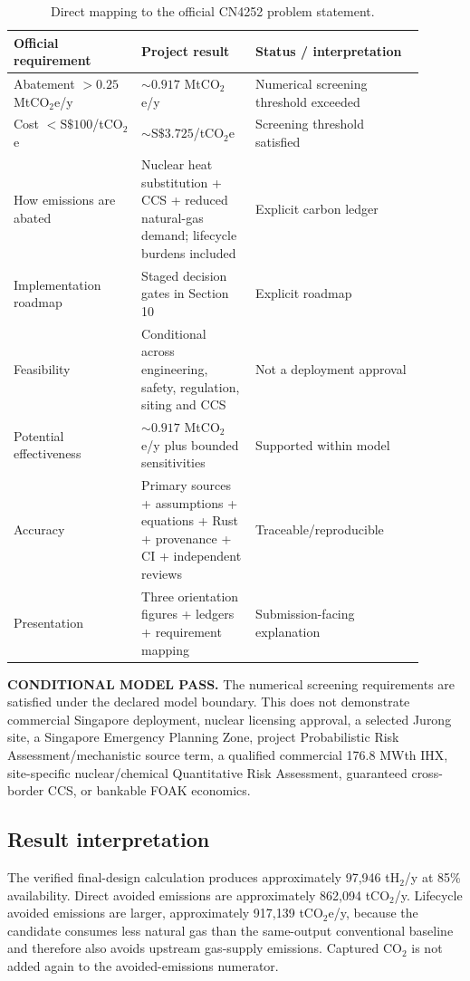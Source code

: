 \begin{table}[htbp]\centering\small
\caption{Direct mapping to the official CN4252 problem statement.}
\begin{tabular}{p{0.28\linewidth}p{0.25\linewidth}p{0.37\linewidth}}
\toprule Official requirement & Project result & Status / interpretation \\ \midrule
Abatement $>0.25$ MtCO$_2$e/y & $\sim0.917$ MtCO$_2$e/y & Numerical screening threshold exceeded\\
Cost $<\mathrm{S\$}100$/tCO$_2$e & $\sim\mathrm{S\$}3.725$/tCO$_2$e & Screening threshold satisfied\\
How emissions are abated & Nuclear heat substitution + CCS + reduced natural-gas demand; lifecycle burdens included & Explicit carbon ledger\\
Implementation roadmap & Staged decision gates in Section 10 & Explicit roadmap\\
Feasibility & Conditional across engineering, safety, regulation, siting and CCS & Not a deployment approval\\
Potential effectiveness & $\sim0.917$ MtCO$_2$e/y plus bounded sensitivities & Supported within model\\
Accuracy & Primary sources + assumptions + equations + Rust + provenance + CI + independent reviews & Traceable/reproducible\\
Presentation & Three orientation figures + ledgers + requirement mapping & Submission-facing explanation\\
\bottomrule
\end{tabular}
\end{table}

\noindent\textbf{CONDITIONAL MODEL PASS.} The numerical screening requirements are satisfied under the declared model boundary. This does not demonstrate commercial Singapore deployment, nuclear licensing approval, a selected Jurong site, a Singapore Emergency Planning Zone, project Probabilistic Risk Assessment/mechanistic source term, a qualified commercial 176.8 MWth IHX, site-specific nuclear/chemical Quantitative Risk Assessment, guaranteed cross-border CCS, or bankable FOAK economics.

\subsection{Result interpretation}
The verified final-design calculation produces approximately 97,946 tH$_2$/y at 85\% availability. Direct avoided emissions are approximately 862,094 tCO$_2$/y. Lifecycle avoided emissions are larger, approximately 917,139 tCO$_2$e/y, because the candidate consumes less natural gas than the same-output conventional baseline and therefore also avoids upstream gas-supply emissions. Captured CO$_2$ is not added again to the avoided-emissions numerator.

